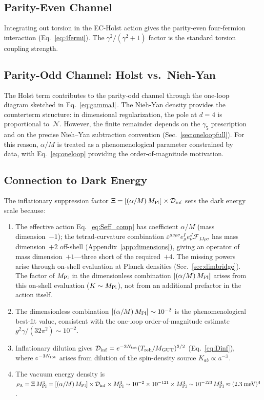 \documentclass[aps,prd,twocolumn,superscriptaddress,showpacs,preprintnumbers,nofootinbib,longbibliography,floatfix]{revtex4-2}
\newcommand{\Dinf}{\mathcal{D}_{\rm inf}}
\newcommand{\MPl}{M_{\rm Pl}}
\begin{document}
\subsection{Parity-Even Channel}

Integrating out torsion in the EC-Holst action gives the parity-even four-fermion interaction (Eq.~\ref{eq:4fermi}). The $\gamma^2/(\gamma^2+1)$ factor is the standard torsion coupling strength.

\subsection{Parity-Odd Channel: Holst vs.\ Nieh-Yan}

The Holst term contributes to the parity-odd channel through the one-loop diagram sketched in Eq.~\eqref{eq:gamma1}. The Nieh-Yan density provides the counterterm structure: in dimensional regularization, the pole at $d=4$ is proportional to~$\mathcal{N}$. However, the finite remainder depends on the $\gamma_5$ prescription and on the precise Nieh--Yan subtraction convention (Sec.~\ref{sec:oneloopfull}). For this reason, $\alpha/M$ is treated as a phenomenological parameter constrained by data, with Eq.~\eqref{eq:oneloop} providing the order-of-magnitude motivation.

\subsection{Connection to Dark Energy}

The inflationary suppression factor $\Xi = [(\alpha/M)\,\MPl]\times\Dinf$ sets the dark energy scale because:
\begin{enumerate}[leftmargin=*]
\item The effective action Eq.~\eqref{eq:Seff_comp} has coefficient $\alpha/M$ (mass dimension~$-1$); the tetrad-curvature combination $\varepsilon^{\mu\nu\rho\sigma}e^I_\mu e^J_\nu \mathcal{F}_{IJ\rho\sigma}$ has mass dimension~$+2$ off-shell (Appendix~\ref{app:dimensions}), giving an operator of mass dimension~$+1$---three short of the required~$+4$. The missing powers arise through on-shell evaluation at Planck densities (Sec.~\ref{sec:dimbridge}). The factor of $\MPl$ in the dimensionless combination $[(\alpha/M)\,\MPl]$ arises from this on-shell evaluation ($K\sim\MPl$), not from an additional prefactor in the action itself.
\item The dimensionless combination $[(\alpha/M)\,\MPl]\sim 10^{-2}$ is the phenomenological best-fit value, consistent with the one-loop order-of-magnitude estimate $g^2\gamma/(32\pi^2)\sim 10^{-2}$.
\item Inflationary dilution gives $\Dinf = e^{-3N_{\rm tot}}(T_{\rm reh}/M_{\rm GUT})^{3/2}$ (Eq.~\ref{eq:Dinf}), where $e^{-3N_{\rm tot}}$ arises from dilution of the spin-density source $K_{ab}\propto a^{-3}$.
\item The vacuum energy density is $\rho_\Lambda = \Xi\,\MPl^4 = [(\alpha/M)\,\MPl]\times\Dinf\times\MPl^4 \sim 10^{-2}\times 10^{-121}\times\MPl^4 \sim 10^{-123}\,\MPl^4 \approx (2.3\;\text{meV})^4$.
\end{enumerate}
\end{document}
